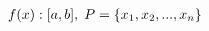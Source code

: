 \documentclass[preview]{standalone}
\begin{document}
\begin{align*}
f(x):[a,b], \hspace{0.1cm} P = \{x_1,x_2,...,x_n\}
\end{align*}
\end{document}
